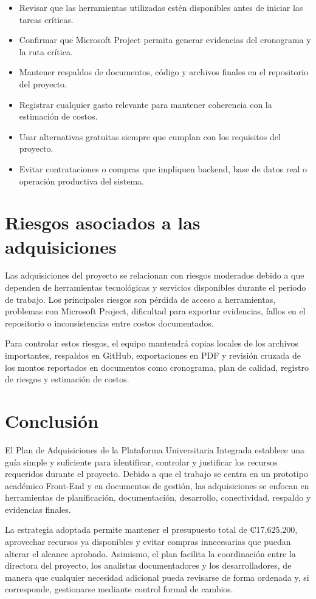 \documentclass[11pt,spanish]{article}
\begin{document}
\begin{itemize}[leftmargin=*, label={\textbullet}]
    \item Revisar que las herramientas utilizadas estén disponibles antes de iniciar las tareas críticas.
    \item Confirmar que Microsoft Project permita generar evidencias del cronograma y la ruta crítica.
    \item Mantener respaldos de documentos, código y archivos finales en el repositorio del proyecto.
    \item Registrar cualquier gasto relevante para mantener coherencia con la estimación de costos.
    \item Usar alternativas gratuitas siempre que cumplan con los requisitos del proyecto.
    \item Evitar contrataciones o compras que impliquen backend, base de datos real o operación productiva del sistema.
\end{itemize}

\section{Riesgos asociados a las adquisiciones}

Las adquisiciones del proyecto se relacionan con riesgos moderados debido a que dependen de herramientas tecnológicas y servicios disponibles durante el periodo de trabajo. Los principales riesgos son pérdida de acceso a herramientas, problemas con Microsoft Project, dificultad para exportar evidencias, fallos en el repositorio o inconsistencias entre costos documentados.

Para controlar estos riesgos, el equipo mantendrá copias locales de los archivos importantes, respaldos en GitHub, exportaciones en PDF y revisión cruzada de los montos reportados en documentos como cronograma, plan de calidad, registro de riesgos y estimación de costos.

\section{Conclusión}

El Plan de Adquisiciones de la Plataforma Universitaria Integrada establece una guía simple y suficiente para identificar, controlar y justificar los recursos requeridos durante el proyecto. Debido a que el trabajo se centra en un prototipo académico Front-End y en documentos de gestión, las adquisiciones se enfocan en herramientas de planificación, documentación, desarrollo, conectividad, respaldo y evidencias finales.

La estrategia adoptada permite mantener el presupuesto total de ₡17,625,200, aprovechar recursos ya disponibles y evitar compras innecesarias que puedan alterar el alcance aprobado. Asimismo, el plan facilita la coordinación entre la directora del proyecto, los analistas documentadores y los desarrolladores, de manera que cualquier necesidad adicional pueda revisarse de forma ordenada y, si corresponde, gestionarse mediante control formal de cambios.
\end{document}
